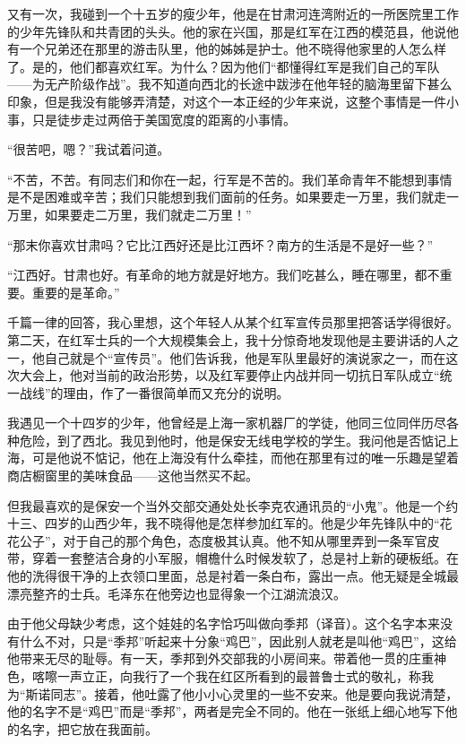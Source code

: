 \documentclass[10pt]{book}
\begin{document}
又有一次，我碰到一个十五岁的瘦少年，他是在甘肃河连湾附近的一所医院里工作的少年先锋队和共青团的头头。他的家在兴国，那是红军在江西的模范县，他说他有一个兄弟还在那里的游击队里，他的姊姊是护士。他不晓得他家里的人怎么样了。是的，他们都喜欢红军。为什么？因为他们“都懂得红军是我们自己的军队——为无产阶级作战”。我不知道向西北的长途中跋涉在他年轻的脑海里留下甚么印象，但是我没有能够弄清楚，对这个一本正经的少年来说，这整个事情是一件小事，只是徒步走过两倍于美国宽度的距离的小事情。

“很苦吧，嗯？”我试着问道。

“不苦，不苦。有同志们和你在一起，行军是不苦的。我们革命青年不能想到事情是不是困难或辛苦；我们只能想到我们面前的任务。如果要走一万里，我们就走一万里，如果要走二万里，我们就走二万里！”

“那末你喜欢甘肃吗？它比江西好还是比江西坏？南方的生活是不是好一些？”

“江西好。甘肃也好。有革命的地方就是好地方。我们吃甚么，睡在哪里，都不重要。重要的是革命。”

千篇一律的回答，我心里想，这个年轻人从某个红军宣传员那里把答话学得很好。第二天，在红军士兵的一个大规模集会上，我十分惊奇地发现他是主要讲话的人之一，他自己就是个“宣传员”。他们告诉我，他是军队里最好的演说家之一，而在这次大会上，他对当前的政治形势，以及红军要停止内战并同一切抗日军队成立“统一战线”的理由，作了一番很简单而又充分的说明。

我遇见一个十四岁的少年，他曾经是上海一家机器厂的学徒，他同三位同伴历尽各种危险，到了西北。我见到他时，他是保安无线电学校的学生。我问他是否惦记上海，可是他说不惦记，他在上海没有什么牵挂，而他在那里有过的唯一乐趣是望着商店橱窗里的美味食品——这他当然买不起。

但我最喜欢的是保安一个当外交部交通处处长李克农通讯员的“小鬼”。他是一个约十三、四岁的山西少年，我不晓得他是怎样参加红军的。他是少年先锋队中的“花花公子”，对于自己的那个角色，态度极其认真。他不知从哪里弄到一条军官皮带，穿着一套整洁合身的小军服，帽檐什么时候发软了，总是衬上新的硬板纸。在他的洗得很干净的上衣领口里面，总是衬着一条白布，露出一点。他无疑是全城最漂亮整齐的士兵。毛泽东在他旁边也显得象一个江湖流浪汉。

由于他父母缺少考虑，这个娃娃的名字恰巧叫做向季邦（译音）。这个名字本来没有什么不对，只是“季邦”听起来十分象“鸡巴”，因此别人就老是叫他“鸡巴”，这给他带来无尽的耻辱。有一天，季邦到外交部我的小房间来。带着他一贯的庄重神色，喀嚓一声立正，向我行了一个我在红区所看到的最普鲁士式的敬礼，称我为“斯诺同志”。接着，他吐露了他小小心灵里的一些不安来。他是要向我说清楚，他的名字不是“鸡巴”而是“季邦”，两者是完全不同的。他在一张纸上细心地写下他的名字，把它放在我面前。
\end{document}
